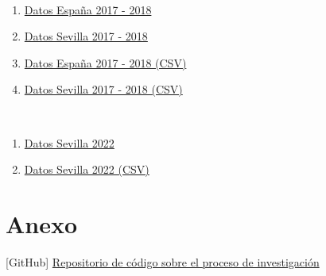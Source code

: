 \documentclass[a4paper,10pt]{article}
\begin{document}
    \clearpage
    \begin{thebibliography}{20}

            \ 
            \begin{enumerate}
                \item \href{https://datahippo.org/es/region/599216cb8a4655339b819813/}{Datos España 2017 - 2018}
                \item \href{https://datahippo.org/es/region/599230af8a46554edf884651/}{Datos Sevilla 2017 - 2018}
                \item \href{https://datahippo.org/media/regions/58612732-b2dc-433b-ab78-b8fbe5bbbb16/599216cb8a4655339b819813_airbnb.csv}{Datos España 2017 - 2018 (CSV)}
                \item \href{https://datahippo.org/media/regions/7e3f7365-8ec0-42f1-a277-9b82743b8a39/599230af8a46554edf884651_airbnb.csv}{Datos Sevilla 2017 - 2018 (CSV)}
            \end{enumerate}
        
            \
            \begin{enumerate}
                \item \href{http://insideairbnb.com/get-the-data/}{Datos Sevilla 2022}
                \item \href{http://data.insideairbnb.com/spain/andaluc%C3%ADa/sevilla/2023-03-31/visualisations/listings.csv}{Datos Sevilla 2022 (CSV)}
            \end{enumerate}

    \end{thebibliography}
    
    \hypertarget{anexo}{}
    \section*{Anexo}

        \hypertarget{github}{[GitHub] \href{https://github.com/m7pantoja/TouristRental}{Repositorio de código sobre el proceso de investigación}}
\end{document}
